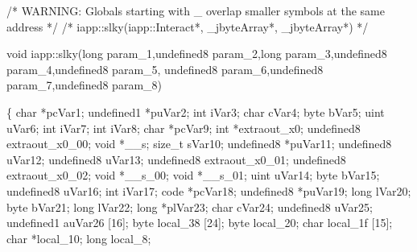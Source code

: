 \documentclass[
]{article}
\newenvironment{Shaded}{}{}
\newcommand{\NormalTok}[1]{#1}
\begin{document}
\begin{Shaded}
\begin{Highlighting}[]
\NormalTok{/* WARNING: Globals starting with \textquotesingle{}\_\textquotesingle{} overlap smaller symbols at the same address */}
\NormalTok{/* iapp::slky(iapp::Interact*, \_jbyteArray*, \_jbyteArray*) */}

\NormalTok{void iapp::slky(long param\_1,undefined8 param\_2,long param\_3,undefined8 param\_4,undefined8 param\_5,}
\NormalTok{               undefined8 param\_6,undefined8 param\_7,undefined8 param\_8)}

\NormalTok{\{}
\NormalTok{  char *pcVar1;}
\NormalTok{  undefined1 *puVar2;}
\NormalTok{  int iVar3;}
\NormalTok{  char cVar4;}
\NormalTok{  byte bVar5;}
\NormalTok{  uint uVar6;}
\NormalTok{  int iVar7;}
\NormalTok{  int iVar8;}
\NormalTok{  char *pcVar9;}
\NormalTok{  int *extraout\_x0;}
\NormalTok{  undefined8 extraout\_x0\_00;}
\NormalTok{  void *\_\_s;}
\NormalTok{  size\_t sVar10;}
\NormalTok{  undefined8 *puVar11;}
\NormalTok{  undefined8 uVar12;}
\NormalTok{  undefined8 uVar13;}
\NormalTok{  undefined8 extraout\_x0\_01;}
\NormalTok{  undefined8 extraout\_x0\_02;}
\NormalTok{  void *\_\_s\_00;}
\NormalTok{  void *\_\_s\_01;}
\NormalTok{  uint uVar14;}
\NormalTok{  byte bVar15;}
\NormalTok{  undefined8 uVar16;}
\NormalTok{  int iVar17;}
\NormalTok{  code *pcVar18;}
\NormalTok{  undefined8 *puVar19;}
\NormalTok{  long lVar20;}
\NormalTok{  byte bVar21;}
\NormalTok{  long lVar22;}
\NormalTok{  long *plVar23;}
\NormalTok{  char cVar24;}
\NormalTok{  undefined8 uVar25;}
\NormalTok{  undefined1 auVar26 [16];}
\NormalTok{  byte local\_38 [24];}
\NormalTok{  byte local\_20;}
\NormalTok{  char local\_1f [15];}
\NormalTok{  char *local\_10;}
\NormalTok{  long local\_8;}
  

\end{Highlighting}
\end{Shaded}
\end{document}
